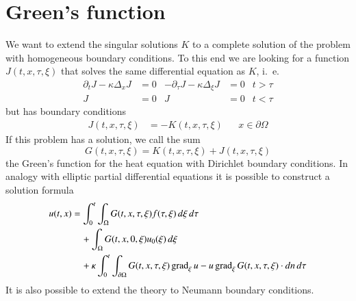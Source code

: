 %
%
%
\section{Green's function}
We want to extend the singular solutions $K$ to a complete solution 
of the problem with homogeneous boundary conditions.
To this end we are looking for a function
$J(t,x,\tau,\xi)$ that solves the same differential equation as $K$, i.~e.
\begin{align*}
\partial_t J-\kappa\Delta_xJ&=0
&
-\partial_\tau J-\kappa\Delta_\xi J&=0
&t>\tau
\\
J&=0&J&=0&t<\tau
\end{align*}
but has boundary conditions
\begin{align*}
J(t,x,\tau,\xi)&=-K(t,x,\tau,\xi)&&x\in\partial\Omega
\end{align*}
If this problem has a solution, we call the sum
\[
G(t,x,\tau,\xi)=K(t,x,\tau,\xi)+J(t,x,\tau,\xi)
\]
the Green's function for the heat equation with Dirichlet boundary
conditions.
In analogy with  elliptic partial differential equations it is possible
to construct a solution formula
\begin{align}
u(t,x)&=
\int_0^t\int_{\Omega}G(t,x,\tau,\xi)f(\tau,\xi)\,d\xi\,d\tau
\notag
\\
&\quad+\int_{\Omega}G(t,x,0,\xi)u_0(\xi)\,d\xi
\notag
\\
&\quad +\kappa\int_0^t\int_{\partial \Omega}
G(t,x,\tau,\xi)\operatorname{grad}_\xi u
-u\operatorname{grad}_\xi G(t,x,\tau,\xi)\cdot dn\,d\tau
\label{green-parabolisch}
\end{align}
It is also possible to extend the theory to Neumann boundary conditions.

